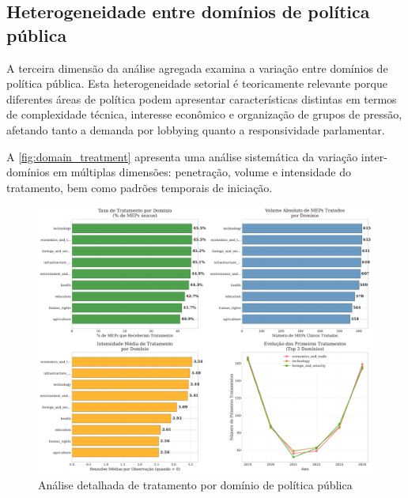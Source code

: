 \subsection{Heterogeneidade entre domínios de política pública}

A terceira dimensão da análise agregada examina a variação entre domínios de política pública. Esta heterogeneidade setorial é teoricamente relevante porque diferentes áreas de política podem apresentar características distintas em termos de complexidade técnica, interesse econômico e organização de grupos de pressão, afetando tanto a demanda por lobbying quanto a responsividade parlamentar.


A \autoref{fig:domain_treatment} apresenta uma análise sistemática da variação inter-domínios em múltiplas dimensões: penetração, volume e intensidade do tratamento, bem como padrões temporais de iniciação.

\begin{figure}[htbp]
\centering
\includegraphics[width=\textwidth]{figures/fig7_domain_treatment_analysis.pdf}
\caption{Análise detalhada de tratamento por domínio de política pública}
\label{fig:domain_treatment}
\end{figure}

